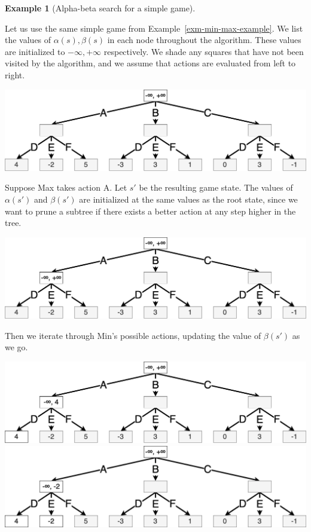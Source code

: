 \documentclass[
  letterpaper,
  DIV=11,
  numbers=noendperiod]{scrreprt}
\theoremstyle{plain}
\theoremstyle{plain}
\theoremstyle{definition}
\newtheorem{example}{Example}[chapter]
\theoremstyle{definition}
\theoremstyle{remark}
\begin{document}
\begin{example}[Alpha-beta search for a simple
game]\protect\hypertarget{exm-alpha-beta-example}{}\label{exm-alpha-beta-example}

Let us use the same simple game from Example~\ref{exm-min-max-example}.
We list the values of \(\alpha(s), \beta(s)\) in each node throughout
the algorithm. These values are initialized to \(-\infty, +\infty\)
respectively. We shade any squares that have not been visited by the
algorithm, and we assume that actions are evaluated from left to right.

\includegraphics{./shared/alpha-beta-0.png}

Suppose Max takes action A. Let \(s'\) be the resulting game state. The
values of \(\alpha(s')\) and \(\beta(s')\) are initialized at the same
values as the root state, since we want to prune a subtree if there
exists a better action at any step higher in the tree.

\includegraphics{./shared/alpha-beta-1.png}

Then we iterate through Min's possible actions, updating the value of
\(\beta(s')\) as we go.

\includegraphics{./shared/alpha-beta-2.png}
\includegraphics{./shared/alpha-beta-3.png}


\end{example}
\end{document}
